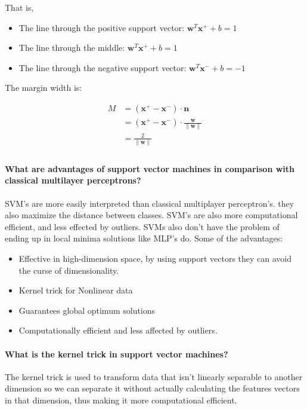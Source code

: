 That is,

\begin{itemize}
    \item The line through the positive support vector: $\bm{w}^T \bm{x}^+ + b = 1$
    \item The line through the middle: $\bm{w}^T \bm{x}^+ + b = 1$
    \item The line through the negative support vector: $\bm{w}^T \bm{x}^- + b = -1$
\end{itemize}

The margin width is:

\begin{align*}
    M & = (\bm{x}^+ - \bm{x}^-) \cdot \bm{n} \\
    & = (\bm{x}^+ - \bm{x}^-) \cdot \frac{\bm{w}}{\lVert \bm{w} \rVert} \\
    & = \frac{2}{\lVert \bm{w} \rVert} \\
\end{align*}

\paragraph{What are advantages of support vector machines in comparison with classical multilayer perceptrons?}

SVM's are more easily interpreted than classical multiplayer perceptron's. they also maximize the
distance between classes. SVM's are also more computational efficient, and less effected by outliers.
SVMs also don't have the problem of ending up in local minima solutions like MLP's do.
Some of the advantages:

\begin{itemize}
    \item Effective in high-dimension space, by using support vectors they can avoid the curse of
    dimensionality.
    \item Kernel trick for Nonlinear data
    \item Guarantees global optimum solutions
    \item Computationally efficient and less affected by outliers.
\end{itemize}

\paragraph{What is the kernel trick in support vector machines?}

The kernel trick is used to transform data that isn't linearly separable to another dimension so we can
separate it without actually calculating the features vectors in that dimension, thus making it more
computational efficient.

